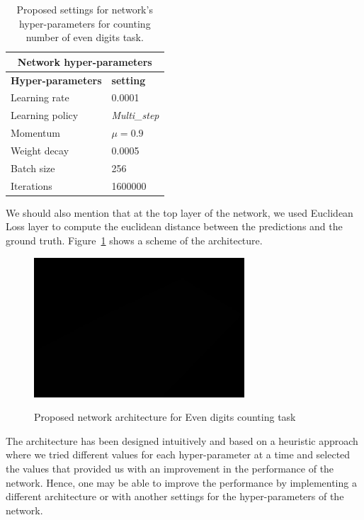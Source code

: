 \begin{table}[H]
	\centering
	\begin{tabular}{ |p{3.8cm}|p{1.7cm}| }
	\hline 
	\multicolumn{2}{|c|}{\textbf{Network hyper-parameters}} \\
	\hline
	\hline
	\textbf{Hyper-parameters} & \textbf{setting }\\
	\hline
	Learning rate & 0.0001\\
	\hline
	Learning policy    & \textit{Multi\_step} \\
	\hline
	Momentum & $\mu = 0.9$\\
	\hline
	Weight decay & 0.0005 \\
	\hline
	Batch size & 256 \\
	\hline
	Iterations & 1600000 \\
	\hline
	\end{tabular}
		\caption{Proposed settings for network's hyper-parameters for counting number of even digits task.}
		\label{hypers}
\end{table}
 

\noindent We should also mention that at the top layer of the network, we used Euclidean Loss layer to compute the euclidean distance between the predictions and the ground truth.  Figure~\ref{fig:l2cNet} shows a scheme of the architecture.
\begin{figure}[H]
  \centering
   {\includegraphics[width=0.7\textwidth]{images/1}}
	\caption{Proposed network architecture for Even digits counting task}
	\label{fig:l2cNet}
\end{figure}

The architecture has been designed intuitively and based on a heuristic approach where we tried different values for each hyper-parameter at a time and selected the values that provided us with an improvement in the performance of the network. Hence, one may be able to improve the performance by implementing a different architecture or with another settings for the hyper-parameters of the network. 

